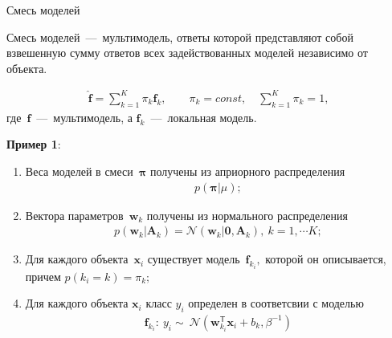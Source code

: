 \documentclass[9pt,pdf,hyperref={unicode}]{beamer}
\begin{document}
\begin{frame}{Смесь моделей}
\justifying
\begin{definition}
Смесь моделей~---~мультимодель, ответы которой представляют собой взвешенную сумму ответов всех задействованных моделей независимо от объекта.

\begin{equation}
\label{sl:2:eq:1}
	\begin{aligned}
		\hat{\textbf{f}} = \sum_{k=1}^{K}\pi_{k}\textbf{f}_k, \qquad \pi_{k} = const, \quad \sum_{k=1}^{K}\pi_{k} = 1,
	\end{aligned}
\end{equation}
где~$\textbf{f}$~---~мультимодель, а $\textbf{f}_k$~---~локальная модель.
\end{definition}

{\bf Пример 1}:
\begin{enumerate}
	\item Веса моделей в смеси~$\bm{\pi}$ получены из априорного распределения 
		\begin{equation}
		\label{sl:2:eq:2}
			\begin{aligned}
				p\left(\bm{\pi}|\mu\right);
			\end{aligned}
		\end{equation}
	\item Вектора параметров~$\textbf{w}_k$ получены из нормального распределения 
		\begin{equation}
		\label{sl:2:eq:3}
			\begin{aligned}
				p\left(\textbf{w}_k|\textbf{A}_k\right) = \mathcal{N}\left(\textbf{w}_k|\textbf{0}, \textbf{A}_{k}\right),~k=1,\cdots K;
			\end{aligned}
		\end{equation}
		
	\item Для каждого объекта~$\textbf{x}_i$ существует модель~$\textbf{f}_{k_i},$ которой он описывается, причем $p\left(k_i=k\right) = \pi_k;$
	
	\item  Для каждого объекта $\textbf{x}_i$ класс $y_i$ определен в соответсвии с моделью 
		\begin{equation}
		\label{sl:2:eq:3}
			\begin{aligned}
				\textbf{f}_{k_i}:~y_i\sim~\mathcal{N}\left(\textbf{w}_{k_i}^{\mathsf{T}}\textbf{x}_i + b_k, \beta^{-1}\right)
			\end{aligned}
		\end{equation}
\end{enumerate}

\end{frame}
\end{document}

